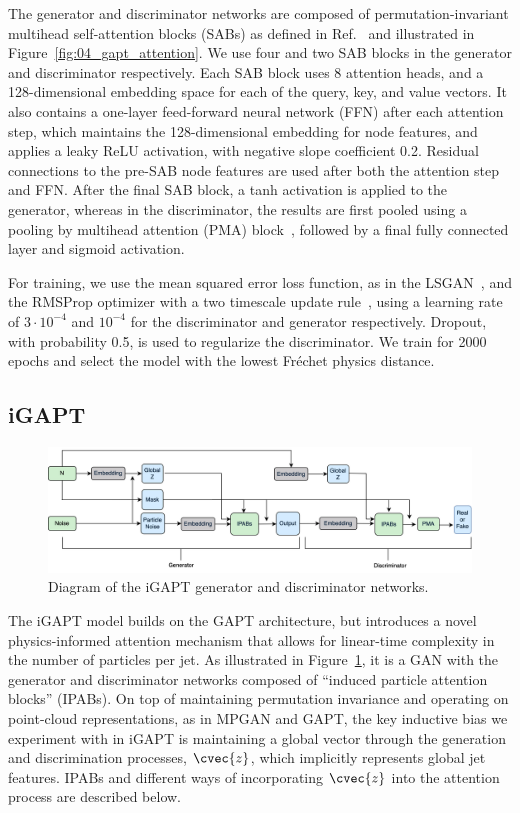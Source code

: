 The generator and discriminator networks are composed of permutation-invariant multihead self-attention blocks (SABs) as defined in Ref.~\cite{lee2019set} and illustrated in Figure~\ref{fig:04_gapt_attention}.
We use four and two SAB blocks in the generator and discriminator respectively.
Each SAB block uses 8 attention heads, and a 128-dimensional embedding space for each of the query, key, and value vectors.
It also contains a one-layer feed-forward neural network (FFN) after each attention step, which maintains the 128-dimensional embedding for node features, and applies a leaky ReLU activation, with negative slope coefficient 0.2.
Residual connections to the pre-SAB node features are used after both the attention step and FFN.
After the final SAB block, a tanh activation is applied to the generator, whereas in the discriminator, the results are first pooled using a pooling by multihead attention (PMA) block~\cite{lee2019set}, followed by a final fully connected layer and sigmoid activation.

For training, we use the mean squared error loss function, as in the LSGAN~\cite{mao_lsgan}, and the RMSProp optimizer with a two timescale update rule~\cite{TTUR}, using a learning rate of $3\cdot10^{-4}$ and $10^{-4}$ for the discriminator and generator respectively.
Dropout, with probability 0.5, is used to regularize the discriminator.
We train for 2000 epochs and select the model with the lowest Fr\'echet physics distance.

\subsection{iGAPT}
\label{sec:04_gapt_igapt}

\begin{figure}[ht]
    \centering
    \captionsetup{justification=centering}
    \includegraphics[width=1\linewidth]{figures/04-ML4Sim/igapt/gapt.png}
    \caption{Diagram of the iGAPT generator and discriminator networks.}
    \label{fig:04_igapt_arch}
\end{figure}


The iGAPT model builds on the GAPT architecture, but introduces a novel physics-informed attention mechanism that allows for linear-time complexity in the number of particles per jet.
As illustrated in Figure~\ref{fig:04_igapt_arch}, it is a GAN with the generator and discriminator networks composed of ``induced particle attention blocks'' (IPABs).
On top of maintaining permutation invariance and operating on point-cloud representations, as in MPGAN and GAPT, the key inductive bias we experiment with in iGAPT is maintaining a global vector through the generation and discrimination processes, $\cvec{z}$, which implicitly represents global jet features.
IPABs and different ways of incorporating $\cvec{z}$ into the attention process are described below.

